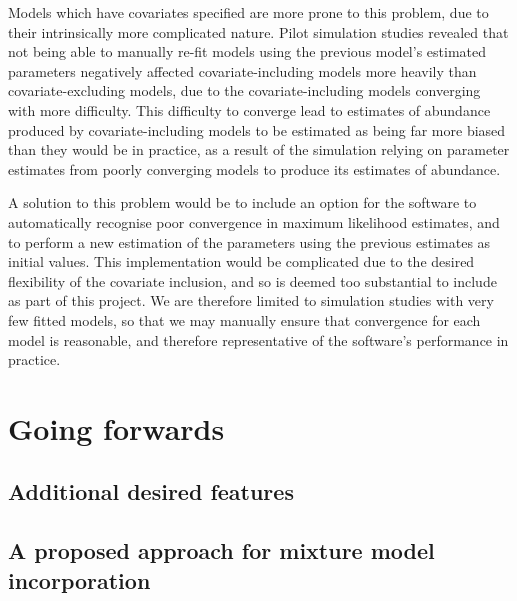 \documentclass[11pt]{article}
\begin{document}
\begin{multicols}{2}
Models which have covariates specified are more prone to this problem, due to their intrinsically more complicated nature. Pilot simulation studies revealed that not being able to manually re-fit models using the previous model's estimated parameters negatively affected covariate-including models more heavily than covariate-excluding models, due to the covariate-including models converging with more difficulty. This difficulty to converge lead to estimates of abundance produced by covariate-including models to be estimated as being far more biased than they would be in practice, as a result of the simulation relying on parameter estimates from poorly converging models to produce its estimates of abundance.

A solution to this problem would be to include an option for the software to automatically recognise poor convergence in maximum likelihood estimates, and to perform a new estimation of the parameters using the previous estimates as initial values. This implementation would be complicated due to the desired flexibility of the covariate inclusion, and so is deemed too substantial to include as part of this project. We are therefore limited to simulation studies with very few fitted models, so that we may manually ensure that convergence for each model is reasonable, and therefore representative of the software's performance in practice. 
\section{Going forwards}
\subsection{Additional desired features}
\subsection{A proposed approach for mixture model incorporation}

\end{multicols}
\end{document}
